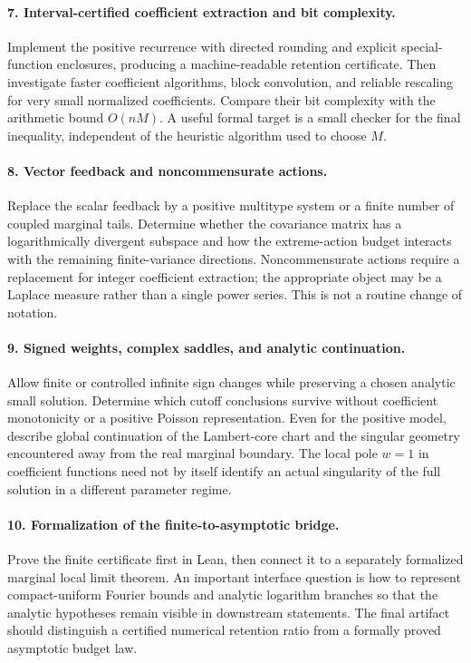 \documentclass[11pt,a4paper]{article}
\numberwithin{equation}{section}
\theoremstyle{definition}
\theoremstyle{remark}
\begin{document}
\paragraph{7. Interval-certified coefficient extraction and bit complexity.}
Implement the positive recurrence with directed rounding and explicit
special-function enclosures, producing a machine-readable retention
certificate. Then investigate faster coefficient algorithms, block
convolution, and reliable rescaling for very small normalized coefficients.
Compare their bit complexity with the arithmetic bound \(O(nM)\). A useful
formal target is a small checker for the final inequality, independent of
the heuristic algorithm used to choose \(M\).

\paragraph{8. Vector feedback and noncommensurate actions.}
Replace the scalar feedback by a positive multitype system or a finite
number of coupled marginal tails. Determine whether the covariance matrix
has a logarithmically divergent subspace and how the extreme-action budget
interacts with the remaining finite-variance directions. Noncommensurate
actions require a replacement for integer coefficient extraction; the
appropriate object may be a Laplace measure rather than a single power
series. This is not a routine change of notation.

\paragraph{9. Signed weights, complex saddles, and analytic continuation.}
Allow finite or controlled infinite sign changes while preserving a chosen
analytic small solution. Determine which cutoff conclusions survive without
coefficient monotonicity or a positive Poisson representation. Even for the
positive model, describe global continuation of the Lambert-core chart and
the singular geometry encountered away from the real marginal boundary.
The local pole \(w=1\) in coefficient functions need not by itself identify
an actual singularity of the full solution in a different parameter regime.

\paragraph{10. Formalization of the finite-to-asymptotic bridge.}
Prove the finite certificate first in Lean, then connect it to a separately
formalized marginal local limit theorem. An important interface question is
how to represent compact-uniform Fourier bounds and analytic logarithm
branches so that the analytic hypotheses remain visible in downstream
statements. The final artifact should distinguish a certified numerical
retention ratio from a formally proved asymptotic budget law.
\end{document}
